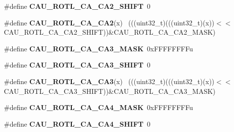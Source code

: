 \begin{DoxyCompactItemize}
\item 
\hypertarget{group___c_a_u___register___masks_ga8b25b4c825c9173a0abd5efdd58a82e4}{}\#define {\bfseries C\+A\+U\+\_\+\+R\+O\+T\+L\+\_\+\+C\+A\+\_\+\+C\+A2\+\_\+\+S\+H\+I\+F\+T}~0\label{group___c_a_u___register___masks_ga8b25b4c825c9173a0abd5efdd58a82e4}

\item 
\hypertarget{group___c_a_u___register___masks_ga4bb26d3536ddde55cfa78ec924f70c7f}{}\#define {\bfseries C\+A\+U\+\_\+\+R\+O\+T\+L\+\_\+\+C\+A\+\_\+\+C\+A2}(x)                                          ~(((uint32\+\_\+t)(((uint32\+\_\+t)(x))$<$$<$C\+A\+U\+\_\+\+R\+O\+T\+L\+\_\+\+C\+A\+\_\+\+C\+A2\+\_\+\+S\+H\+I\+F\+T))\&C\+A\+U\+\_\+\+R\+O\+T\+L\+\_\+\+C\+A\+\_\+\+C\+A2\+\_\+\+M\+A\+S\+K)\label{group___c_a_u___register___masks_ga4bb26d3536ddde55cfa78ec924f70c7f}

\item 
\hypertarget{group___c_a_u___register___masks_gac3bb01fa4c02a43a9367a61519d287f2}{}\#define {\bfseries C\+A\+U\+\_\+\+R\+O\+T\+L\+\_\+\+C\+A\+\_\+\+C\+A3\+\_\+\+M\+A\+S\+K}~0x\+F\+F\+F\+F\+F\+F\+F\+Fu\label{group___c_a_u___register___masks_gac3bb01fa4c02a43a9367a61519d287f2}

\item 
\hypertarget{group___c_a_u___register___masks_gaefb05fe2e03750f3f2123bb5014e8d80}{}\#define {\bfseries C\+A\+U\+\_\+\+R\+O\+T\+L\+\_\+\+C\+A\+\_\+\+C\+A3\+\_\+\+S\+H\+I\+F\+T}~0\label{group___c_a_u___register___masks_gaefb05fe2e03750f3f2123bb5014e8d80}

\item 
\hypertarget{group___c_a_u___register___masks_ga01c020c68f19a6eeb989124dd2bc4155}{}\#define {\bfseries C\+A\+U\+\_\+\+R\+O\+T\+L\+\_\+\+C\+A\+\_\+\+C\+A3}(x)                                          ~(((uint32\+\_\+t)(((uint32\+\_\+t)(x))$<$$<$C\+A\+U\+\_\+\+R\+O\+T\+L\+\_\+\+C\+A\+\_\+\+C\+A3\+\_\+\+S\+H\+I\+F\+T))\&C\+A\+U\+\_\+\+R\+O\+T\+L\+\_\+\+C\+A\+\_\+\+C\+A3\+\_\+\+M\+A\+S\+K)\label{group___c_a_u___register___masks_ga01c020c68f19a6eeb989124dd2bc4155}

\item 
\hypertarget{group___c_a_u___register___masks_gadbb02082ccfd702cac02e0201c2810ae}{}\#define {\bfseries C\+A\+U\+\_\+\+R\+O\+T\+L\+\_\+\+C\+A\+\_\+\+C\+A4\+\_\+\+M\+A\+S\+K}~0x\+F\+F\+F\+F\+F\+F\+F\+Fu\label{group___c_a_u___register___masks_gadbb02082ccfd702cac02e0201c2810ae}

\item 
\hypertarget{group___c_a_u___register___masks_ga696c3db5a2a4f5c7452d2b3ff573f7c1}{}\#define {\bfseries C\+A\+U\+\_\+\+R\+O\+T\+L\+\_\+\+C\+A\+\_\+\+C\+A4\+\_\+\+S\+H\+I\+F\+T}~0\label{group___c_a_u___register___masks_ga696c3db5a2a4f5c7452d2b3ff573f7c1}


\end{DoxyCompactItemize}

